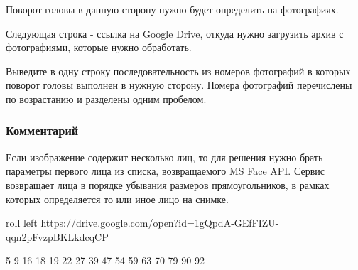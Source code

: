 Поворот головы в данную сторону нужно будет определить на фотографиях.

Следующая строка - ссылка на Google Drive, откуда нужно загрузить архив с фотографиями, которые нужно обработать.

\outputfmtSection

Выведите в одну строку последовательность из номеров фотографий в которых поворот головы выполнен в нужную сторону. Номера фотографий перечислены по возрастанию и разделены одним пробелом.

\subsubsection*{Комментарий}

Если изображение содержит несколько лиц, то для решения нужно брать параметры первого лица из списка, возвращаемого MS Face API. Сервис возвращает лица в порядке убывания размеров прямоугольников, в рамках которых определяется то или иное лицо на снимке. 

\begin{myverbbox}[\small]{\vinput} 
    roll left
    https://drive.google.com/open?id=1gQpdA-GEfFIZU-qqn2pFvzpBKLkdcqCP
\end{myverbbox}
\begin{myverbbox}[\small]{\voutput}
    5 9 16 18 19 22 27 39 47 54 59 63 70 79 90 92
\end{myverbbox}


